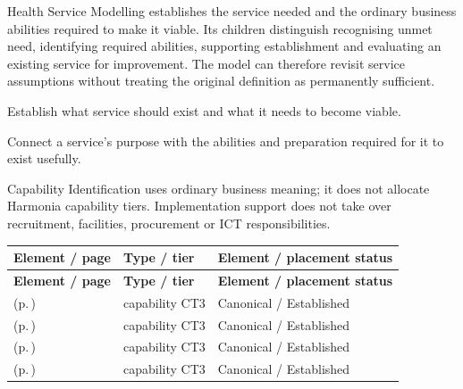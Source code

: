 Health Service Modelling establishes the service needed and the ordinary business abilities required to make it viable. Its children distinguish recognising unmet need, identifying required abilities, supporting establishment and evaluating an existing service for improvement. The model can therefore revisit service assumptions without treating the original definition as permanently sufficient.



Establish what service should exist and what it needs to become viable.



Connect a service's purpose with the abilities and preparation required for it to exist usefully.



Capability Identification uses ordinary business meaning; it does not allocate Harmonia capability tiers. Implementation support does not take over recruitment, facilities, procurement or ICT responsibilities.


\begingroup\small\setlength{\TableWidth}{\dimexpr\linewidth-6\tabcolsep-4\arrayrulewidth\relax}
\begin{longtable}{|>{\raggedright\arraybackslash}p{0.52\TableWidth}|>{\raggedright\arraybackslash}p{0.2\TableWidth}|>{\raggedright\arraybackslash}p{0.28\TableWidth}|}
\hline\rowcolor{TableHead}\textbf{Element / page} & \textbf{Type / tier} & \textbf{Element / placement status}\\\hline\endfirsthead
\hline\rowcolor{TableHead}\textbf{Element / page} & \textbf{Type / tier} & \textbf{Element / placement status}\\\hline\endhead
\hline\endfoot
\nameref{cap:bc-health-service-need-identification} (p.\,\pageref{cap:bc-health-service-need-identification}) & capability CT3 & Canonical / Established\\\hline
\nameref{cap:bc-health-service-capability-identification} (p.\,\pageref{cap:bc-health-service-capability-identification}) & capability CT3 & Canonical / Established\\\hline
\nameref{cap:bc-health-service-implementation-support} (p.\,\pageref{cap:bc-health-service-implementation-support}) & capability CT3 & Canonical / Established\\\hline
\nameref{cap:bc-health-service-continuous-improvement} (p.\,\pageref{cap:bc-health-service-continuous-improvement}) & capability CT3 & Canonical / Established\\\hline
\end{longtable}\endgroup

